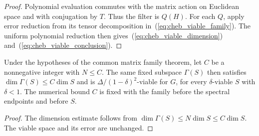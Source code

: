 \begin{proof}\leanok
    Polynomial evaluation commutes with the matrix action on Euclidean
    space and with conjugation by $T$. Thus the filter is $Q(H)$.
    For each $Q$, apply error reduction from its tensor decomposition
    in~(\ref{eq:cheb_viable_family}). The uniform polynomial reduction
    then gives~(\ref{eq:cheb_viable_dimension}) and~(\ref{eq:cheb_viable_conclusion}).
\end{proof}

\begin{theorem}
    \label{thm:matrix_family_chebyshev_viability_card_bound}
    \leanok
    Under the hypotheses of the common matrix family theorem, let $C$ be a
    nonnegative integer with $N\le C$. The same fixed subspace
    $\Gamma(S)$ then satisfies $\dim\Gamma(S)\le C\dim S$ and is
    $\Delta/(1-\delta)^2$-viable for $G$, for every $\delta$-viable $S$
    with $\delta<1$.
    The numerical bound $C$ is fixed with the family before the spectral
    endpoints and before $S$.
\end{theorem}

\begin{proof}\leanok
    The dimension estimate follows from
    $\dim\Gamma(S)\le N\dim S\le C\dim S$. The viable space and its error
    are unchanged.
\end{proof}

